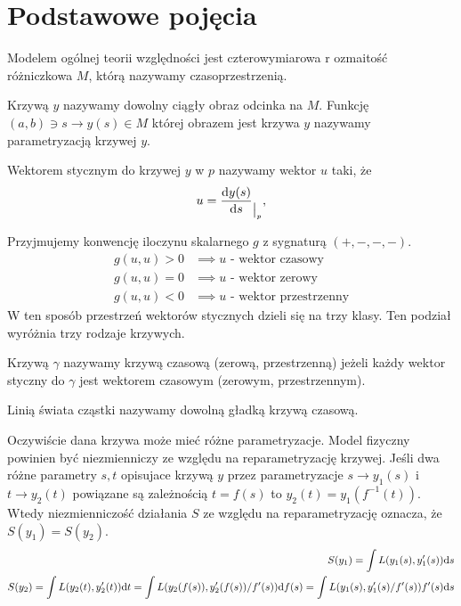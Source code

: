 \section{Podstawowe pojęcia}
Modelem ogólnej teorii względności jest czterowymiarowa r
ozmaitość różniczkowa $M$, którą 
nazywamy czasoprzestrzenią.
\begin{definition}
Krzywą $y$ nazywamy dowolny ciągły obraz odcinka na $M$. 
Funkcję $ (a,b) \ni s \to y(s) \in M$ której obrazem jest 
krzywa $y$ nazywamy parametryzacją krzywej $y$.
\end{definition}
\begin{definition}
Wektorem stycznym do krzywej $y$ w $p$ nazywamy wektor $u$ taki, że
\begin{align*}
u = \frac{\text{d} y(s)}{\text{d} s}_{\big|_p},
\end{align*}
\end{definition}
Przyjmujemy konwencję iloczynu skalarnego $g$ z sygnaturą $(+,-,-,-)$.
\begin{align}
g(u,u) > 0& \implies u \text{ - wektor czasowy}\\
g(u,u) = 0& \implies u \text{ - wektor zerowy}\\
g(u,u) < 0& \implies u \text{ - wektor przestrzenny}
\end{align}
W ten sposób przestrzeń wektorów stycznych dzieli się na trzy 
klasy. Ten podział wyróżnia trzy rodzaje krzywych. 
\begin{definition}
Krzywą $\gamma$ nazywamy krzywą czasową (zerową, przestrzenną)
jeżeli każdy wektor styczny do $\gamma$ jest wektorem czasowym
(zerowym, przestrzennym).
\end{definition}
\begin{definition}
Linią świata cząstki nazywamy dowolną gładką krzywą czasową.
\end{definition}
Oczywiście dana krzywa może mieć różne parametryzacje.
Model fizyczny powinien być niezmienniczy ze względu na 
reparametryzację krzywej. Jeśli 
dwa różne parametry $s,t$ opisujace krzywą $y$
przez parametryzacje $s \to y_1(s)$ i $t\to y_2(t)$
powiązane są zależnością $t = f(s)$ to
$y_2(t) = y_1( f^{-1}(t) )$. Wtedy niezmienniczość 
działania $S$ ze względu na reparametryzację 
oznacza, że $S(y_1) = S(y_2)$.
\begin{align}
S(y_1) = \int L( y_1(s) , y'_1(s) ) \text{d} s \\
S(y_2) = \int L ( y_2(t), y_2'(t) )  \text{d} t = 
\int L ( y_2(f(s)), y_2'(f(s)) / f'(s) )  \text{d} f(s) = 
\int L ( y_1(s), y_1'(s) /f'(s) ) f'(s) \text{d} s  
\end{align} 
